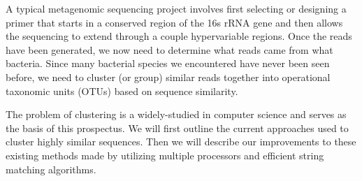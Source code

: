 A typical metagenomic sequencing project involves first selecting or designing a primer that starts in a conserved region of the 16s rRNA gene and then allows the sequencing to extend through a couple hypervariable regions.
Once the reads have been generated, we now need to determine what reads came from what bacteria.
Since many bacterial species we encountered have never been seen before\cite{gill_metagenomic_2006}, we need to cluster (or group) similar reads together into operational taxonomic units (OTUs) based on sequence similarity.

The problem of clustering is a widely-studied in computer science\cite{fasulo_analysis_1999} and serves as the basis of this prospectus.
We will first outline the current approaches used to cluster highly similar sequences.
Then we will describe our improvements to these existing methods made by utilizing multiple processors and efficient string matching algorithms.






